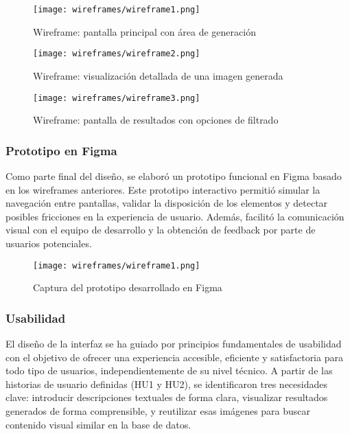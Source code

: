 \begin{figure}[H]
    \centering
    \texttt{[image: wireframes/wireframe1.png]}
    \caption{Wireframe: pantalla principal con área de generación}
    \label{fig:wireframe1}
\end{figure}

\begin{figure}[H]
    \centering
    \texttt{[image: wireframes/wireframe2.png]}
    \caption{Wireframe: visualización detallada de una imagen generada}
    \label{fig:wireframe3}
\end{figure}

\begin{figure}[H]
    \centering
    \texttt{[image: wireframes/wireframe3.png]}
    \caption{Wireframe: pantalla de resultados con opciones de filtrado}
    \label{fig:wireframe2}
\end{figure}

\subsubsection{Prototipo en Figma}

Como parte final del diseño, se elaboró un prototipo funcional en Figma basado en los wireframes anteriores. Este prototipo interactivo permitió simular la navegación entre pantallas, validar la disposición de los elementos y detectar posibles fricciones en la experiencia de usuario. Además, facilitó la comunicación visual con el equipo de desarrollo y la obtención de feedback por parte de usuarios potenciales.

\begin{figure}[H]
    \centering
    \texttt{[image: wireframes/wireframe1.png]}
    \caption{Captura del prototipo desarrollado en Figma}
    \label{fig:figma-prototype}
\end{figure}

\subsubsection{Usabilidad}

El diseño de la interfaz se ha guiado por principios fundamentales de usabilidad con el objetivo de ofrecer una experiencia accesible, eficiente y satisfactoria para todo tipo de usuarios, independientemente de su nivel técnico. A partir de las historias de usuario definidas (HU1 y HU2), se identificaron tres necesidades clave: introducir descripciones textuales de forma clara, visualizar resultados generados de forma comprensible, y reutilizar esas imágenes para buscar contenido visual similar en la base de datos.

